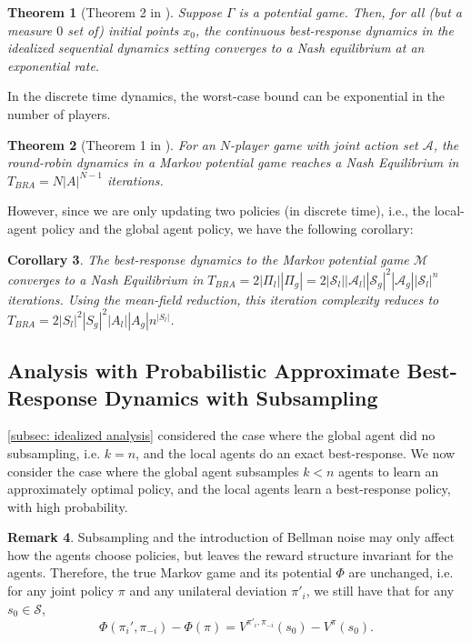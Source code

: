 \documentclass{article}
\theoremstyle{plain}
\newtheorem{theorem}{Theorem}[section]
\newtheorem{corollary}[theorem]{Corollary}
\theoremstyle{definition}
\newtheorem{remark}[theorem]{Remark}
\begin{document}
\begin{theorem}[Theorem 2 in \cite{doi:10.1137/17M1139461}] Suppose $\Gamma$ is a potential game. Then, for all (but a measure $0$ set of) initial points $x_0$, the continuous best-response dynamics in the idealized sequential dynamics setting converges to a Nash equilibrium at an  exponential rate.
\end{theorem}

In the discrete time dynamics, the worst-case bound can be exponential in the number of players. 
\begin{theorem}[Theorem 1 in \cite{DurandGaujal:2016:ACBRA}] For an $N$-player game with joint action set $\mathcal{A}$, the round-robin dynamics in a Markov potential game reaches a Nash Equilibrium in $T_{BRA} = N |A|^{N-1}$ iterations.
\end{theorem}

However, since we are only updating two policies (in discrete time), i.e., the local-agent policy and the global agent policy, we have the following corollary:
\begin{corollary}
    The best-response dynamics to the Markov potential game $\mathcal{M}$ converges to a Nash Equilibrium in $T_{BRA} = 2|\Pi_l||\Pi_g| = 2|\mathcal{S}_l||\mathcal{A}_l||\mathcal{S}_g|^2|\mathcal{A}_g| |\mathcal{S}_l|^n$ iterations. Using the mean-field reduction, this iteration complexity reduces to $T_{BRA} = 2|S_l|^2|S_g|^2|A_l||A_g|n^{|S_l|}$.\\
\end{corollary}


\subsection{ Analysis with Probabilistic Approximate Best-Response Dynamics with Subsampling}

\cref{subsec: idealized analysis} considered the case where the global agent did no subsampling, i.e. $k=n$, and the local agents do an exact best-response. We now consider the case where the global agent subsamples $k < n$ agents to learn an approximately optimal policy, and the local agents learn a best-response policy, with high probability.\\

\begin{remark}
    Subsampling and the introduction of Bellman noise may only affect how the agents choose policies, but leaves the reward structure invariant for the agents. Therefore, the true Markov game and its potential $\Phi$ are unchanged, i.e. for any joint policy $\pi$ and any unilateral deviation $\pi'_i$, we still have that for any $s_0 \in \mathcal{S}$,
    \begin{equation}\Phi(\pi_i', \pi_{-i}) - \Phi(\pi) = V^{\pi'_i, \pi_{-i}}(s_0) - V^\pi(s_0).\end{equation}
\end{remark}
\end{document}
